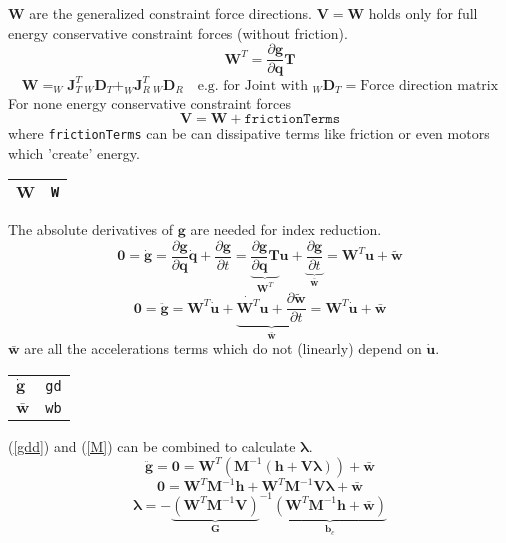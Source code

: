 \documentclass{article}
\newcommand{\bs}[1]{\boldsymbol #1}
\begin{document}
$\bs{W}$ are the generalized constraint force directions.
$\bs{V}=\bs{W}$ holds only for full energy conservative constraint forces (without friction).
\begin{equation}
  \bs{W}^T=\frac{\partial \bs{g}}{\partial \bs{q}}\bs{T}
\end{equation}
\begin{equation}
  \bs{W}=_W\bs{J}_T^T\,_W\bs{D}_T+_W\bs{J}_R^T\,_W\bs{D}_R \quad\text{e.g. for Joint with $_W\bs{D}_T=$Force direction matrix}
\end{equation}
For none energy conservative constraint forces
\begin{equation}
  \bs{V}=\bs{W} + \texttt{frictionTerms}
\end{equation}
where \texttt{frictionTerms} can be can dissipative terms like friction or even motors which 'create' energy.

\begin{tabular}{|l|l|}
  \hline
  $\bs{W}$ & \texttt{W} \\
  \hline
\end{tabular}

The absolute derivatives of $\bs{g}$ are needed for index reduction.
\begin{equation}
  \bs{0}=\dot{\bs{g}}=\frac{\partial\bs{g}}{\partial\bs{q}}\dot{\bs{q}}+\frac{\partial\bs{g}}{\partial t}=\underbrace{\frac{\partial\bs{g}}{\partial\bs{q}}\bs{T}}_{\bs{W}^T}\bs{u}+\underbrace{\frac{\partial\bs{g}}{\partial t}}_{\bar{\bs{w}}}=\bs{W}^T \bs{u}+\tilde{\bs{w}}
\end{equation}
\begin{equation}
  \bs{0}=\ddot{\bs{g}}=\bs{W}^T \dot{\bs{u}} + \underbrace{\dot{\bs{W}^T}\bs{u}+\frac{\partial\tilde{\bs{w}}}{\partial t}}_{\bar{\bs{w}}}=\bs{W}^T \dot{\bs{u}} + \bar{\bs{w}}
  \label{gdd}
\end{equation}
$\bar{\bs{w}}$ are all the accelerations terms which do not (linearly) depend on $\dot{\bs{u}}$.

\begin{tabular}{|l|l|}
  \hline
  $\dot{\bs{g}}$ & \texttt{gd} \\
  $\bar{\bs{w}}$ & \texttt{wb} \\
  \hline
\end{tabular}

(\ref{gdd}) and (\ref{M}) can be combined to calculate $\bs{\lambda}$.
\begin{equation}
  \ddot{\bs{g}}=\bs{0}=\bs{W}^T \left( \bs{M}^{-1}\left(\bs{h}+\bs{V}\bs{\lambda}\right) \right) + \bar{\bs{w}}
\end{equation}
\begin{equation}
  \bs{0}=\bs{W}^T \bs{M}^{-1}\bs{h}+\bs{W}^T \bs{M}^{-1}\bs{V}\bs{\lambda} + \bar{\bs{w}}
\end{equation}
\begin{equation}
  \bs{\lambda}=-{\underbrace{\left(\bs{W}^T \bs{M}^{-1}\bs{V}\right)}_{\bs{G}}}^{-1}\underbrace{\left( \bs{W}^T \bs{M}^{-1}\bs{h} + \bar{\bs{w}} \right)}_{\bs{b}_c}
\end{equation}
\end{document}
